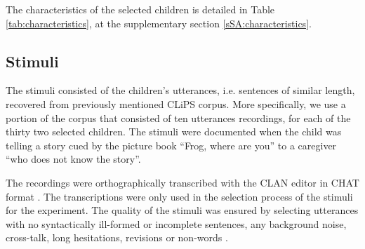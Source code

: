 The characteristics of the selected children is detailed in Table \ref{tab:characteristics}, at the supplementary section \ref{sSA:characteristics}. 
%
%
\subsection{Stimuli} \label{sS:stimuli}
%
The stimuli consisted of the children's utterances, i.e. sentences of similar length, recovered from previously mentioned CLiPS corpus. More specifically, we use a portion of the corpus that consisted of ten utterances recordings, for each of the thirty two selected children. The stimuli were documented when the child was telling a story cued by the picture book ``Frog, where are you'' \citep{Mayer_1969} to a caregiver ``who does not know the story''. 

The recordings were orthographically transcribed with the CLAN editor in CHAT format \cite{MacWhinney_2020}. The transcriptions were only used in the selection process of the stimuli for the experiment. The quality of the stimuli was ensured by selecting utterances with no syntactically ill-formed or incomplete sentences, any background noise, cross-talk, long hesitations, revisions or non-words \citep{Boonen_et_al_2021}. 


